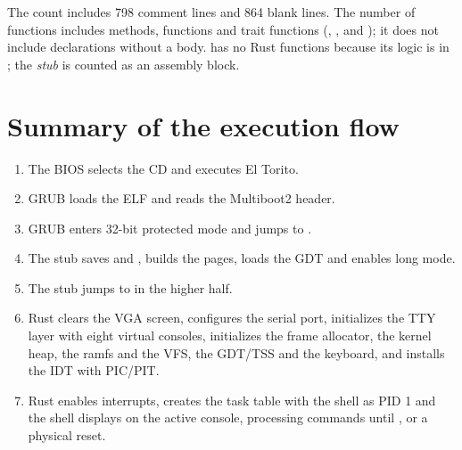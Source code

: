 \begin{nota}
The count includes 798 comment lines and 864 blank lines. The number
of functions includes  methods,  functions
and trait functions (, ,  and
); it does not include  declarations without a
body.  has no Rust functions because its logic is in
; the \emph{stub} is counted as an assembly block.
\end{nota}

\section{Summary of the execution flow}

\begin{enumerate}
  \item The BIOS selects the CD and executes El Torito.
  \item GRUB loads the ELF and reads the Multiboot2 header.
  \item GRUB enters 32-bit protected mode and jumps to .
  \item The stub saves  and , builds the pages, loads the
        GDT and enables long mode.
  \item The stub jumps to  in the higher half.
  \item Rust clears the VGA screen, configures the serial port, initializes
        the TTY layer with eight virtual consoles, initializes the frame
        allocator, the kernel heap, the ramfs and the VFS, the GDT/TSS and the
        keyboard, and installs the IDT with PIC/PIT.
  \item Rust enables interrupts, creates the task table with the shell as
        PID 1 and the shell displays  on the active console,
        processing commands until ,  or a physical
        reset.
\end{enumerate}
